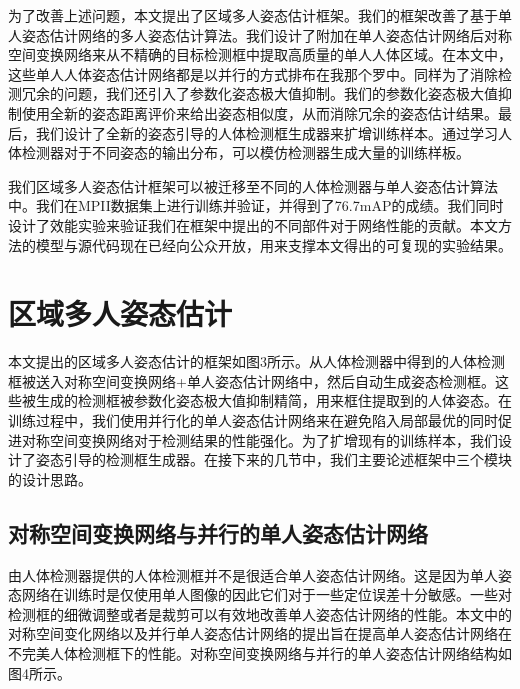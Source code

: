 为了改善上述问题，本文提出了区域多人姿态估计框架。我们的框架改善了基于单人姿态估计网络的多人姿态估计算法。我们设计了附加在单人姿态估计网络后对称空间变换网络来从不精确的目标检测框中提取高质量的单人人体区域。在本文中，这些单人人体姿态估计网络都是以并行的方式排布在我那个罗中。同样为了消除检测冗余的问题，我们还引入了参数化姿态极大值抑制。我们的参数化姿态极大值抑制使用全新的姿态距离评价来给出姿态相似度，从而消除冗余的姿态估计结果。最后，我们设计了全新的姿态引导的人体检测框生成器来扩增训练样本。通过学习人体检测器对于不同姿态的输出分布，可以模仿检测器生成大量的训练样板。

我们区域多人姿态估计框架可以被迁移至不同的人体检测器与单人姿态估计算法中。我们在MPII数据集上进行训练并验证，并得到了76.7mAP的成绩。我们同时设计了效能实验来验证我们在框架中提出的不同部件对于网络性能的贡献。本文方法的模型与源代码现在已经向公众开放，用来支撑本文得出的可复现的实验结果。

\section{区域多人姿态估计}
本文提出的区域多人姿态估计的框架如图3所示。从人体检测器中得到的人体检测框被送入对称空间变换网络+单人姿态估计网络中，然后自动生成姿态检测框。这些被生成的检测框被参数化姿态极大值抑制精简，用来框住提取到的人体姿态。在训练过程中，我们使用并行化的单人姿态估计网络来在避免陷入局部最优的同时促进对称空间变换网络对于检测结果的性能强化。为了扩增现有的训练样本，我们设计了姿态引导的检测框生成器。在接下来的几节中，我们主要论述框架中三个模块的设计思路。
\subsection{对称空间变换网络与并行的单人姿态估计网络}
由人体检测器提供的人体检测框并不是很适合单人姿态估计网络。这是因为单人姿态网络在训练时是仅使用单人图像的因此它们对于一些定位误差十分敏感。一些对检测框的细微调整或者是裁剪可以有效地改善单人姿态估计网络的性能。本文中的对称空间变化网络以及并行单人姿态估计网络的提出旨在提高单人姿态估计网络在不完美人体检测框下的性能。对称空间变换网络与并行的单人姿态估计网络结构如图4所示。

